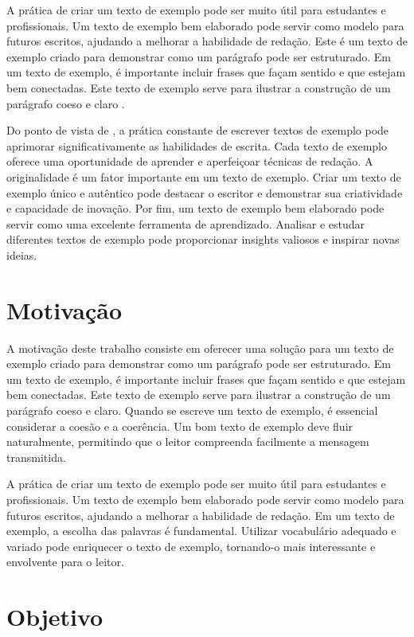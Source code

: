 \documentclass[
	12pt,				%
	oneside,			%
	a4paper,			%
	english,			%
	french,				%
	spanish,			%
	brazil				%
	]{abntex2}
\begin{document}
A prática de criar um texto de exemplo pode ser muito útil para
estudantes e profissionais. Um texto de exemplo bem elaborado pode
servir como modelo para futuros escritos, ajudando a melhorar a
habilidade de redação. Este é um texto de exemplo criado para demonstrar
como um parágrafo pode ser estruturado. Em um texto de exemplo, é
importante incluir frases que façam sentido e que estejam bem
conectadas. Este texto de exemplo serve para ilustrar a construção de um
parágrafo coeso e claro \cite{fulano}.

Do ponto de vista de , a prática constante de
escrever textos de exemplo pode aprimorar significativamente as
habilidades de escrita. Cada texto de exemplo oferece uma oportunidade
de aprender e aperfeiçoar técnicas de redação. A originalidade é um
fator importante em um texto de exemplo. Criar um texto de exemplo único
e autêntico pode destacar o escritor e demonstrar sua criatividade e
capacidade de inovação. Por fim, um texto de exemplo bem elaborado pode
servir como uma excelente ferramenta de aprendizado. Analisar e estudar
diferentes textos de exemplo pode proporcionar insights valiosos e
inspirar novas ideias.

\hypertarget{motivauxe7uxe3o}{%
\section{Motivação}\label{motivauxe7uxe3o}}

A motivação deste trabalho consiste em oferecer uma solução para um
texto de exemplo criado para demonstrar como um parágrafo pode ser
estruturado. Em um texto de exemplo, é importante incluir frases que
façam sentido e que estejam bem conectadas. Este texto de exemplo serve
para ilustrar a construção de um parágrafo coeso e claro. Quando se
escreve um texto de exemplo, é essencial considerar a coesão e a
coerência. Um bom texto de exemplo deve fluir naturalmente, permitindo
que o leitor compreenda facilmente a mensagem transmitida.

A prática de criar um texto de exemplo pode ser muito útil para
estudantes e profissionais. Um texto de exemplo bem elaborado pode
servir como modelo para futuros escritos, ajudando a melhorar a
habilidade de redação. Em um texto de exemplo, a escolha das palavras é
fundamental. Utilizar vocabulário adequado e variado pode enriquecer o
texto de exemplo, tornando-o mais interessante e envolvente para o
leitor.

\hypertarget{objetivo}{%
\section{Objetivo}\label{objetivo}}
\end{document}
